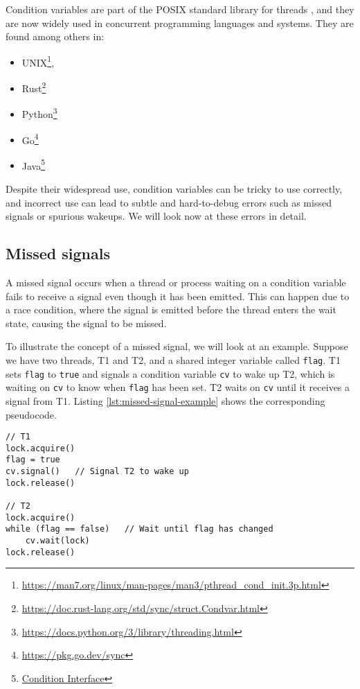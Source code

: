 \documentclass[../Thesis.tex]{subfiles}
\begin{document}
Condition variables are part of the POSIX standard library
for threads \cite{nichols1996pthreads},
and they are now widely used in concurrent programming languages and systems.
They are found among others in:

\begin{itemize}
      \item UNIX\footnote{\url{https://man7.org/linux/man-pages/man3/pthread_cond_init.3p.html}},
      \item Rust\footnote{\url{https://doc.rust-lang.org/std/sync/struct.Condvar.html}}
      \item Python\footnote{\url{https://docs.python.org/3/library/threading.html}}
      \item Go\footnote{\url{https://pkg.go.dev/sync}}
      \item Java\footnote{
                  \href{https://docs.oracle.com/en/java/javase/20/docs/api/java.base/java/util/concurrent/locks/Condition.html}
                  {Condition Interface}}
\end{itemize}

Despite their widespread use, condition variables can be tricky to use correctly,
and incorrect use can lead to subtle and
hard-to-debug errors such as missed signals or spurious wakeups.
We will look now at these errors in detail.

\subsection{Missed signals}

A missed signal occurs when a thread or process waiting on a condition variable
fails to receive a signal even though it has been emitted.
This can happen due to a race condition, where the signal is emitted
before the thread enters the wait state, causing the signal to be missed.

To illustrate the concept of a missed signal, we will look at an example.
Suppose we have two threads, T1 and T2,
and a shared integer variable called \texttt{flag}.
T1 sets \texttt{flag} to \texttt{true} and signals
a condition variable \texttt{cv} to wake up T2,
which is waiting on \texttt{cv} to know when \texttt{flag} has been set.
T2 waits on \texttt{cv} until it receives a signal from T1.
Listing \ref{lst:missed-signal-example} shows the corresponding pseudocode.

\begin{lstlisting}[caption=Pseudocode for a missed signal example, label=lst:missed-signal-example]
// T1
lock.acquire()
flag = true
cv.signal()   // Signal T2 to wake up
lock.release()

// T2
lock.acquire()
while (flag == false)   // Wait until flag has changed
    cv.wait(lock)
lock.release()
\end{lstlisting}
\end{document}
